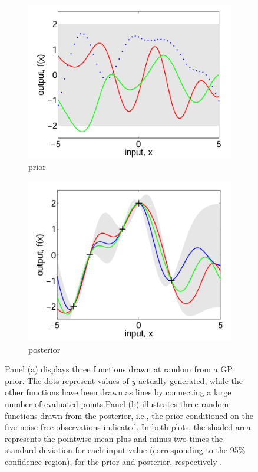 \begin{figure}
    \centering
    \begin{subfigure}[b]{0.5\textwidth}
        \centering
        \includegraphics[width=1\linewidth]{figures/prior.png}
        \caption{prior}
        \label{fig:prior}
    \end{subfigure}
    \hfill
    \begin{subfigure}[b]{0.5\textwidth}
        \centering
        \includegraphics[width=1\linewidth]{posterior.png}
        \caption{posterior}
        \label{fig:posterior}
    \end{subfigure}
    \caption{Panel (a) displays three functions drawn at random from a GP prior. The dots represent values of \(y\) actually generated, while the other functions have been drawn as lines by connecting a large number of evaluated points.Panel (b) illustrates three random functions drawn from the posterior, i.e., the prior conditioned on the five noise-free observations indicated. In both plots, the shaded area represents the pointwise mean plus and minus two times the standard deviation for each input value (corresponding to the 95\% confidence region), for the prior and posterior, respectively \cite{williams2006gaussian}.}
    \label{fig:prior_posterior}
\end{figure}

